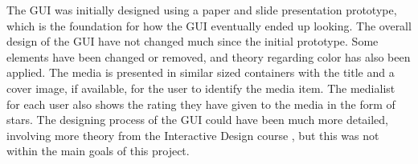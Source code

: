 The GUI was initially designed using a paper and slide presentation prototype, which is the foundation for how the GUI eventually ended up looking. The overall design of the GUI have not changed much since the initial prototype. Some elements have been changed or  removed, and theory regarding color has also been applied. The media is presented in similar sized containers with the title and a cover image, if available, for the user to identify the media item. The medialist for each user also shows the rating they have given to the media in the form of stars. The designing process of the GUI could have been much more detailed, involving more theory from the Interactive Design course \cite{DEBBook}, but this was not within the main goals of this project.